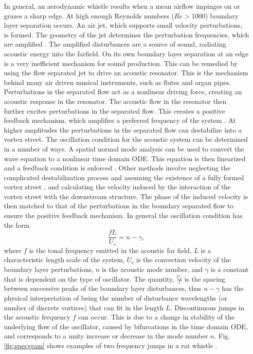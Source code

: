 \documentclass[superscriptaddress, twocolumn, prl]{revtex4}
\begin{document}
In general, an aerodynamic whistle results when a mean airflow impinges on or grazes a sharp edge. At high enough Reynolds numbers ($Re>1000$) boundary layer separation occurs. An air jet, which supports small velocity perturbations, is formed. The geometry of the jet determines the perturbation frequencies, which are amplified \cite{Batchelor1962}. The amplified disturbances are a source of sound, radiating acoustic energy into the farfield. On its own boundary layer separation at an edge is a very inefficient mechanism for sound production. This can be remedied by using the flow separated jet to drive an acoustic resonator. This is the mechanism behind many air driven musical instruments, such as flutes and organ pipes. Perturbations in the separated flow act as a nonlinear driving force, creating an acoustic response in the resonator. The acoustic flow in the resonator then further excites perturbations in the separated flow. This creates a positive feedback mechanism, which amplifies a preferred frequency of the system \cite{Fletcher1998}. At higher amplitudes the perturbations in the separated flow can destabilize into a vortex street. The oscillation condition for the acoustic system can be determined in a number of ways. A spatial normal mode analysis can be used to convert the wave equation to a nonlinear time domain ODE. This equation is then linearized and a feedback condition is enforced \cite{Auvray2012, Auvray2014}. Other methods involve neglecting the complicated destabilization process and assuming the existence of a fully formed vortex street , and calculating the velocity induced by the interaction of the vortex street with the downstream structure. The phase of the induced velocity is then matched to that of the perturbations in the boundary separated flow to ensure the positive feedback mechanism. In general the oscillation condition has the form
\begin{equation}
\label{eq:whistle}
\frac{fL}{U_{c}}=n-\gamma,
\end{equation}
where $f$ is the tonal frequency emitted in the acoustic far field, $L$ is a characteristic length scale of the system, $U_c$ is the convection velocity of the boundary layer perturbations, $n$ is the acoustic mode number, and $\gamma$ is a constant that is dependent on the type of oscillator. The quantity, $\frac{U_c}{f}$ is the spacing between successive peaks of the boundary layer disturbances, thus $n-\gamma$ has the physical interpretation of being the number of disturbance wavelengths (or number of discrete vortices) that can fit in the length $L$. Discontinuous jumps in the acoustic frequency $f$ can occur. This is due to a change in stability of the underlying flow of the oscillator, caused by bifurcations in the time domain ODE, and corresponds to a unity increase or decrease in the mode number $n$. Fig. \ref{fig:specgram} shows examples of two frequency jumps in a rat whistle \cite{Howe2008,Blake1986}.
\end{document}
